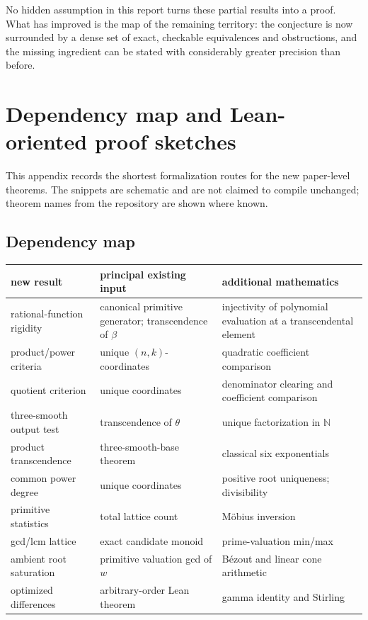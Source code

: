 \documentclass[11pt,oneside]{article}
\theoremstyle{definition}
\newcommand{\N}{\mathbb N}
\begin{document}
No hidden assumption in this report turns these partial results into a proof.  What has
improved is the map of the remaining territory: the conjecture is now surrounded by a
dense set of exact, checkable equivalences and obstructions, and the missing ingredient can
be stated with considerably greater precision than before.

\appendix

\section{Dependency map and Lean-oriented proof sketches}\label{app:lean-sketches}

This appendix records the shortest formalization routes for the new paper-level theorems.
The snippets are schematic and are not claimed to compile unchanged; theorem names from the
repository are shown where known.

\subsection{Dependency map}

\begin{center}
\begin{tabularx}{0.97\textwidth}{@{}lYY@{}}
\toprule
new result & principal existing input & additional mathematics\\
\midrule
rational-function rigidity & canonical primitive generator; transcendence of \(\beta\) & injectivity of polynomial evaluation at a transcendental element\\
product/power criteria & unique \((n,k)\)-coordinates & quadratic coefficient comparison\\
quotient criterion & unique coordinates & denominator clearing and coefficient comparison\\
three-smooth output test & transcendence of \(\theta\) & unique factorization in \(\N\)\\
product transcendence & three-smooth-base theorem & classical six exponentials\\
common power degree & unique coordinates & positive root uniqueness; divisibility\\
primitive statistics & total lattice count & M\"obius inversion\\
gcd/lcm lattice & exact candidate monoid & prime-valuation min/max\\
ambient root saturation & primitive valuation gcd of \(w\) & B\'ezout and linear cone arithmetic\\
optimized differences & arbitrary-order Lean theorem & gamma identity and Stirling\\
\bottomrule
\end{tabularx}
\end{center}
\end{document}
